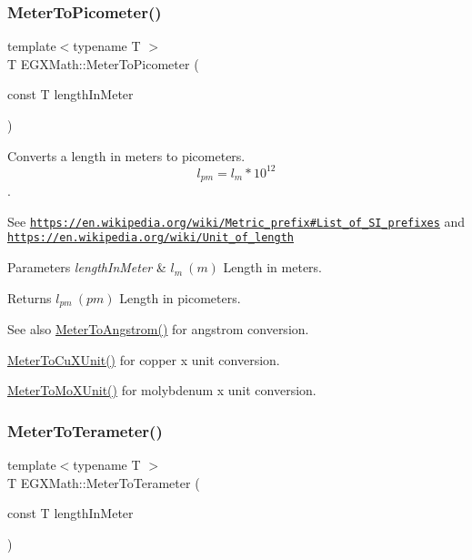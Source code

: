 \subsubsection{\texorpdfstring{Meter\+To\+Picometer()}{MeterToPicometer()}}
{\footnotesize\ttfamily template$<$typename T $>$ \\
T E\+G\+X\+Math\+::\+Meter\+To\+Picometer (\begin{DoxyParamCaption}\item[{const T}]{length\+In\+Meter }\end{DoxyParamCaption})}



Converts a length in meters to picometers. \[ l_{pm}=l_{m} * 10^{12} \]. 

See \href{https://en.wikipedia.org/wiki/Metric_prefix#List_of_SI_prefixes}{\tt https\+://en.\+wikipedia.\+org/wiki/\+Metric\+\_\+prefix\#\+List\+\_\+of\+\_\+\+S\+I\+\_\+prefixes} and \href{https://en.wikipedia.org/wiki/Unit_of_length}{\tt https\+://en.\+wikipedia.\+org/wiki/\+Unit\+\_\+of\+\_\+length} 
\begin{DoxyParams}{Parameters}
{\em length\+In\+Meter} & $ l_{m}\ (m)$ Length in meters. \\
\hline
\end{DoxyParams}
\begin{DoxyReturn}{Returns}
$ l_{pm}\ (pm)$ Length in picometers. 
\end{DoxyReturn}
\begin{DoxySeeAlso}{See also}
\mbox{\hyperlink{group___e_g_x_math-_conversions-_length_conversions-_meter-_non-_s_i_ga9e6d5040f58d167bd7a4b6cebb5527ee}{Meter\+To\+Angstrom()}} for angstrom conversion. 

\mbox{\hyperlink{group___e_g_x_math-_conversions-_length_conversions-_meter-_non-_s_i_ga67cec26b74704753fc51a8f4db27a4b4}{Meter\+To\+Cu\+X\+Unit()}} for copper x unit conversion. 

\mbox{\hyperlink{group___e_g_x_math-_conversions-_length_conversions-_meter-_non-_s_i_gae0351200a3d90c4efe741c6057b2fd4b}{Meter\+To\+Mo\+X\+Unit()}} for molybdenum x unit conversion. 
\end{DoxySeeAlso}
\mbox{\label{group___e_g_x_math-_conversions-_length_conversions-_meter-_s_i_gac4c21d00b7d8e8fc1c9e354f77bf94b2}} 
\subsubsection{\texorpdfstring{Meter\+To\+Terameter()}{MeterToTerameter()}}
{\footnotesize\ttfamily template$<$typename T $>$ \\
T E\+G\+X\+Math\+::\+Meter\+To\+Terameter (\begin{DoxyParamCaption}\item[{const T}]{length\+In\+Meter }\end{DoxyParamCaption})}



